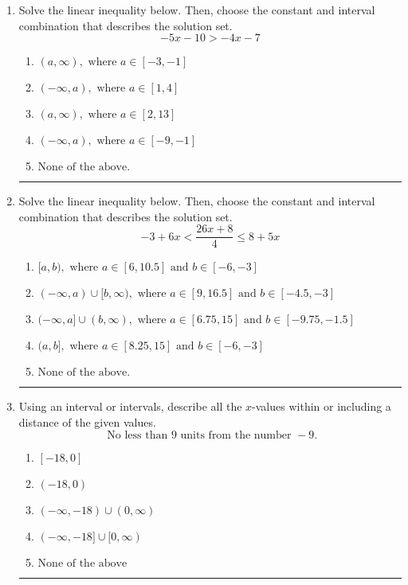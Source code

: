 \documentclass[14pt]{extbook}
\newcommand{\litem}[1]{\item#1\hspace*{-1cm}\rule{\textwidth}{0.4pt}}
\begin{document}
\begin{enumerate}
\litem{
Solve the linear inequality below. Then, choose the constant and interval combination that describes the solution set.\[ -5x -10 > -4x -7 \]\begin{enumerate}[label=\Alph*.]
\item \( (a, \infty), \text{ where } a \in [-3, -1] \)
\item \( (-\infty, a), \text{ where } a \in [1, 4] \)
\item \( (a, \infty), \text{ where } a \in [2, 13] \)
\item \( (-\infty, a), \text{ where } a \in [-9, -1] \)
\item \( \text{None of the above}. \)

\end{enumerate} }
\litem{
Solve the linear inequality below. Then, choose the constant and interval combination that describes the solution set.\[ -3 + 6 x < \frac{26 x + 8}{4} \leq 8 + 5 x \]\begin{enumerate}[label=\Alph*.]
\item \( [a, b), \text{ where } a \in [6, 10.5] \text{ and } b \in [-6, -3] \)
\item \( (-\infty, a) \cup [b, \infty), \text{ where } a \in [9, 16.5] \text{ and } b \in [-4.5, -3] \)
\item \( (-\infty, a] \cup (b, \infty), \text{ where } a \in [6.75, 15] \text{ and } b \in [-9.75, -1.5] \)
\item \( (a, b], \text{ where } a \in [8.25, 15] \text{ and } b \in [-6, -3] \)
\item \( \text{None of the above.} \)

\end{enumerate} }
\litem{
Using an interval or intervals, describe all the $x$-values within or including a distance of the given values.\[ \text{ No less than } 9 \text{ units from the number } -9. \]\begin{enumerate}[label=\Alph*.]
\item \( [-18, 0] \)
\item \( (-18, 0) \)
\item \( (-\infty, -18) \cup (0, \infty) \)
\item \( (-\infty, -18] \cup [0, \infty) \)
\item \( \text{None of the above} \)


\end{enumerate}}
\end{enumerate}
\end{document}
